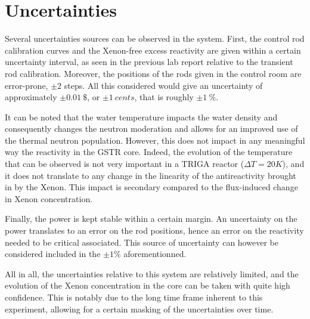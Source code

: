 \section{Uncertainties}

Several uncertainties sources can be observed in the system. First, the control rod calibration curves and the Xenon-free excess reactivity are given within a certain uncertainty interval, as seen in the previous lab report relative to the transient rod calibration. Moreover, the positions of the rods given in the control room are error-prone, $\pm 2$ steps. All this considered would give an uncertainty of approximately $\pm 0.01\ \$$, or $\pm 1\ cents$, that is roughly $\pm 1\ \%$.

It can be noted that the water temperature impacts the water density and consequently changes the neutron moderation and allows for an improved use of the thermal neutron population. However, this does not impact in any meaningful way the reactivity in the GSTR core. Indeed, the evolution of the temperature that can be observed is not very important in a TRIGA reactor ($\Delta T = 20K$), and it does not translate to any change in the linearity of the antireactivity brought in by the Xenon. This impact is secondary compared to the flux-induced change in Xenon concentration.

Finally, the power is kept stable within a certain margin. An uncertainty on the power translates to an error on the rod positions, hence an error on the reactivity needed to be critical associated. This source of uncertainty can however be considered included in the $\pm 1 \%$ aforementionned.

All in all, the uncertainties relative to this system are relatively limited, and the evolution of the Xenon concentration in the core can be taken with quite high confidence. This is notably due to the long time frame inherent to this experiment, allowing for a certain masking of the uncertainties over time.
